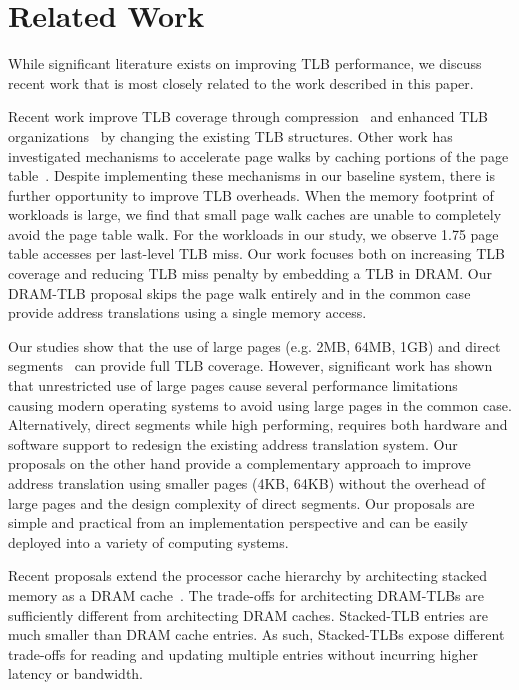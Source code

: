 \section{Related Work}

\noindent While significant literature exists on improving TLB
performance, we discuss recent work that is most closely related to
the work described in this paper.

 Recent work improve TLB
coverage through compression~\cite{COLT, tlbreachclustering} and
enhanced TLB organizations~\cite{SharedLLT, simTLBperf} by changing
the existing TLB structures. Other work has investigated mechanisms to
accelerate page walks by caching portions of the page
table~\cite{SkipPT,MMUcaches}. Despite implementing these mechanisms
in our baseline system, there is further opportunity to improve TLB
overheads. When the memory footprint of workloads is large, we find
that small page walk caches are unable to completely avoid the page
table walk. For the workloads in our study, we observe 1.75 page table
accesses per last-level TLB miss. Our work focuses both on increasing
TLB coverage and reducing TLB miss penalty by embedding a TLB in DRAM.
Our DRAM-TLB proposal skips the page walk entirely and in the common
case provide address translations using a single memory access.

 Our studies show that
the use of large pages (e.g. 2MB, 64MB, 1GB) and direct
segments~\cite{Basu2013} can provide full TLB coverage. However,
significant work has shown that unrestricted use of large pages cause
several performance limitations
~\cite{SuperPageProblem,TwoPageSize,numa-harmful,cameo,largepagevm}
causing modern operating systems to avoid using large pages in the
common case. Alternatively, direct segments while high performing,
requires both hardware and software support to redesign the existing
address translation system. Our proposals on the other hand provide a
complementary approach to improve address translation using smaller
pages (4KB, 64KB) without the overhead of large pages and the design
complexity of direct segments. Our proposals are simple and practical
from an implementation perspective and can be easily deployed into a
variety of computing systems.


 Recent proposals extend the
processor cache hierarchy by architecting stacked memory as a DRAM
cache~\cite{BEAR, moin2012, unison, loh2011, jaewoong2012,
dramcache-resilient}. The trade-offs for architecting DRAM-TLBs are
sufficiently different from architecting DRAM caches. Stacked-TLB
entries are much smaller than DRAM cache entries. As such,
Stacked-TLBs expose different trade-offs for reading and updating
multiple entries without incurring higher latency or bandwidth.

